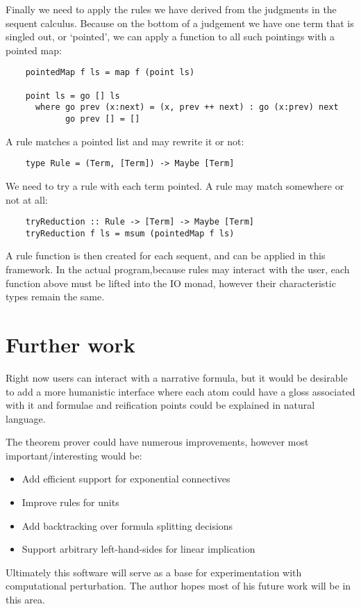 \documentclass[]{article}
\begin{document}
Finally we need to apply the rules we have derived from the judgments in the
sequent calculus. Because on the bottom of a judgement we have one term
that is singled out, or `pointed', we can apply a function to all such
pointings with a pointed map:

\begin{verbatim}
    pointedMap f ls = map f (point ls)
    
    point ls = go [] ls
      where go prev (x:next) = (x, prev ++ next) : go (x:prev) next
            go prev [] = []
\end{verbatim}

A rule matches a pointed list and may rewrite it or not:

\begin{verbatim}
    type Rule = (Term, [Term]) -> Maybe [Term]
\end{verbatim}

We need to try a rule with each term pointed. A rule may match somewhere or
not at all:

\begin{verbatim}
    tryReduction :: Rule -> [Term] -> Maybe [Term]
    tryReduction f ls = msum (pointedMap f ls)  
\end{verbatim}

A rule function is then created for each sequent, and can be applied in this
framework. In the actual program,because rules may interact with the user,
each function above must be lifted into the IO monad, however their
characteristic types remain the same.

\section{Further work}

Right now users can interact with a narrative formula, but it would be
desirable to add a more humanistic interface where each atom could have a
gloss associated with it and formulae and reification points could be
explained in natural language.

The theorem prover could have numerous improvements, however most
important/interesting would be:

\begin{itemize}
    \item Add efficient support for exponential connectives
    \item Improve rules for units
    \item Add backtracking over formula splitting decisions
    \item Support arbitrary left-hand-sides for linear implication
\end{itemize}

Ultimately this software will serve as a base for experimentation with
computational perturbation. The author hopes most of his future
work will be in this area.

{}

\end{document}
